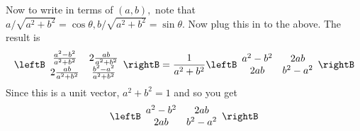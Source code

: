 \begin{enumialphparenastyle}
\begin{ex}
\begin{sol}
Now to write in terms of $\left( a,b\right) ,$ note that $a/\sqrt{a^{2}+b^{2}
}=\cos \theta ,b/\sqrt{a^{2}+b^{2}}=\sin \theta .$ Now plug this in to the
above. The result is
\[
\leftB
\begin{array}{cc}
\frac{a^{2}-b^{2}}{a^{2}+b^{2}} & 2\frac{ab}{a^{2}+b^{2}} \\
2\frac{ab}{a^{2}+b^{2}} & \frac{b^{2}-a^{2}}{a^{2}+b^{2}}
\end{array}
\rightB =\frac{1}{a^{2}+b^{2}}\leftB
\begin{array}{cc}
a^{2}-b^{2} & 2ab \\
2ab & b^{2}-a^{2}
\end{array}
\rightB
\]
Since this is a unit vector, $a^{2}+b^{2}=1$ and so you get
\[
\leftB
\begin{array}{cc}
a^{2}-b^{2} & 2ab \\
2ab & b^{2}-a^{2}
\end{array}
\rightB
\]
\end{sol}
\end{ex}

\end{enumialphparenastyle}